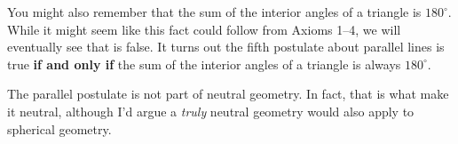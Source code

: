 \documentclass[noauthor,nooutcomes,12pt,hints,newpage,handout]{ximera}
\begin{document}
You might also remember that the sum of the interior angles of a
triangle is $180^\circ$. While it might seem like this fact could
follow from Axioms 1--4, we will eventually see that is false. It turns
out the fifth postulate about parallel lines is true {\bf if and only
  if} the sum of the interior angles of a triangle is always
$180^\circ$.%

\begin{remark}
  The parallel postulate is not part of neutral geometry. In fact,
  that is what make it neutral, although I'd argue a \emph{truly}
  neutral geometry would also apply to spherical geometry.
\end{remark}
\end{document}
